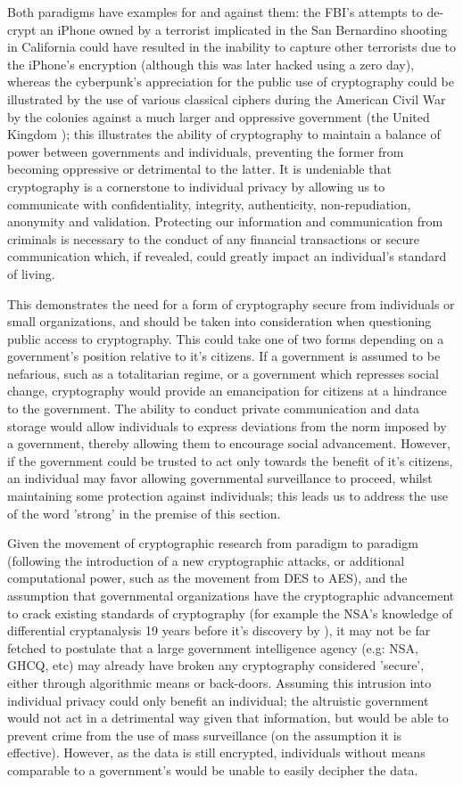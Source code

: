 \documentclass[british,10pt,a4paper]{article}
\begin{document}
Both paradigms have examples for and against them: the FBI's attempts to de-crypt an iPhone owned by a terrorist implicated in the San Bernardino shooting in California could have resulted in the inability to capture other terrorists due to the iPhone's encryption (although this was later hacked using a zero day), whereas the cyberpunk's appreciation for the public use of cryptography could be illustrated by the use of various classical ciphers during the American Civil War by the colonies against a much larger and oppressive government (the United Kingdom \cite{us_cipher}); this illustrates the ability of cryptography to maintain a balance of power between governments and individuals, preventing the former from becoming oppressive or detrimental to the latter. It is undeniable that cryptography is a cornerstone to individual privacy by allowing us to communicate with confidentiality, integrity, authenticity, non-repudiation, anonymity and validation. Protecting our information and communication from criminals is necessary to the conduct of any financial transactions or secure communication which, if revealed, could greatly impact an individual's standard of living. 

This demonstrates the need for a form of cryptography secure from individuals or small organizations, and should be taken into consideration when questioning public access to cryptography. This could take one of two forms depending on a government's position relative to it's citizens. If a government is assumed to be nefarious, such as a totalitarian regime, or a government which represses social change, cryptography would provide an emancipation for citizens at a hindrance to the government. The ability to conduct private communication and data storage would allow individuals to express deviations from the norm imposed by a government, thereby allowing them to encourage social advancement. However, if the government could be trusted to act only towards the benefit of it's citizens, an individual may favor allowing governmental surveillance to proceed, whilst maintaining some protection against individuals; this leads us to address the use of the word 'strong' in the premise of this section.

Given the movement of cryptographic research from paradigm to paradigm (following the introduction of a new cryptographic attacks, or additional computational power, such as the movement from DES to AES), and the assumption that governmental organizations have the cryptographic advancement to crack existing standards of cryptography (for example the NSA's knowledge of differential cryptanalysis 19 years before it's discovery by \citet{biham}), it may not be far fetched to postulate that a large government intelligence agency (e.g: NSA, GHCQ, etc) may already have broken any cryptography considered 'secure', either through algorithmic means or back-doors. Assuming this intrusion into individual privacy could only benefit an individual; the altruistic government would not act in a detrimental way given that information, but would be able to prevent crime from the use of mass surveillance (on the assumption it is effective). However, as the data is still encrypted, individuals without means comparable to a government's would be unable to easily decipher the data. 
\end{document}
